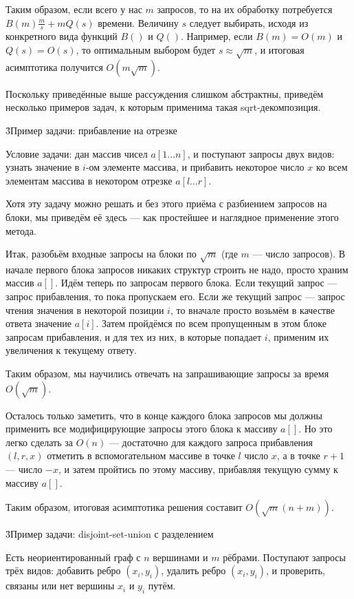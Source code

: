 Таким образом, если всего у нас $m$ запросов, то на их обработку потребуется $B(m) \frac{m}{s} + m Q(s)$ времени. Величину $s$ следует выбирать, исходя из конкретного вида функций $B()$ и $Q()$. Например, если $B(m)=O(m)$ и $Q(s)=O(s)$, то оптимальным выбором будет $s \approx \sqrt{m}$, и итоговая асимптотика получится $O (m \sqrt{m})$.

Поскольку приведённые выше рассуждения слишком абстрактны, приведём несколько примеров задач, к которым применима такая sqrt-декомпозиция.


\h3{Пример задачи: прибавление на отрезке}

Условие задачи: дан массив чисел $a[1 \ldots n]$, и поступают запросы двух видов: узнать значение в $i$-ом элементе массива, и прибавить некоторое число $x$ ко всем элементам массива в некотором отрезке $a[l \dots r]$.

Хотя эту задачу можно решать и без этого приёма с разбиением запросов на блоки, мы приведём её здесь --- как простейшее и наглядное применение этого метода.

Итак, разобьём входные запросы на блоки по $\sqrt{m}$ (где $m$ --- число запросов). В начале первого блока запросов никаких структур строить не надо, просто храним массив $a[]$. Идём теперь по запросам первого блока. Если текущий запрос --- запрос прибавления, то пока пропускаем его. Если же текущий запрос --- запрос чтения значения в некоторой позиции $i$, то вначале просто возьмём в качестве ответа значение $a[i]$. Затем пройдёмся по всем пропущенным в этом блоке запросам прибавления, и для тех из них, в которые попадает $i$, применим их увеличения к текущему ответу.

Таким образом, мы научились отвечать на запрашивающие запросы за время $O(\sqrt{m})$.

Осталось только заметить, что в конце каждого блока запросов мы должны применить все модифицирующие запросы этого блока к массиву $a[]$. Но это легко сделать за $O(n)$ --- достаточно для каждого запроса прибавления $(l,r,x)$ отметить в вспомогательном массиве в точке $l$ число $x$, а в точке $r+1$ --- число $-x$, и затем пройтись по этому массиву, прибавляя текущую сумму к массиву $a[]$.

Таким образом, итоговая асимптотика решения составит $O (\sqrt{m} (n + m))$.


\h3{Пример задачи: disjoint-set-union с разделением}

Есть неориентированный граф с $n$ вершинами и $m$ рёбрами. Поступают запросы трёх видов: добавить ребро $(x_i,y_i)$, удалить ребро $(x_i,y_i)$, и проверить, связаны или нет вершины $x_i$ и $y_i$ путём.

